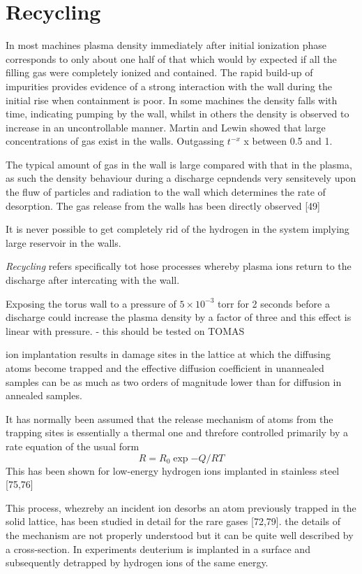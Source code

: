 \chapter{Recycling}

In most machines plasma density immediately after initial ionization phase corresponds to only about one half of that which would by expected if all the filling gas were completely ionized and contained.
The rapid build-up of impurities provides evidence of a strong interaction with the wall during the initial rise when containment is poor.
In some machines the density falls with time, indicating pumping by the wall, whilst in others the density is observed to increase in an uncontrollable manner.
Martin and Lewin showed that large concentrations of gas exist in the walls. Outgassing $t^{-x}$ x between 0.5 and 1.

The typical amount of gas in the wall is large compared with that in the plasma, as such the density behaviour during a discharge cepndends very sensitevely upon the fluw of particles and radiation to the wall
which determines the rate of desorption.
The gas release from the walls has been directly observed [49]

It is never possible to get completely rid of the hydrogen in the system implying large reservoir in the walls.

\textit{Recycling} refers specifically tot hose processes whereby plasma ions return to the discharge after intercating with the wall.

Exposing the torus wall to a pressure of $5 \times 10^{-3}$ torr for 2 seconds before a discharge could increase the plasma density by a factor of three and this effect is linear with pressure. - this should be tested on TOMAS

ion implantation results in damage sites in the lattice at which the diffusing atoms become trapped and the effective diffusion coefficient in unannealed samples can be as much as two orders of magnitude lower than for diffusion in annealed samples.

It has normally been assumed that the release mechanism of atoms from the trapping sites is essentially a thermal one and threfore controlled primarily by a rate equation of the usual form
\begin{equation}
    R = R_0 \exp{-Q/RT}
\end{equation}
This has been shown for low-energy hydrogen ions implanted in stainless steel [75,76]

This process, whezreby an incident ion desorbs an atom previously trapped in the solid lattice, has been studied in detail for the rare gases [72,79].
the details of the mechanism are not properly understood but it can be quite well described by a 
cross-section. In experiments deuterium is implanted in a surface and subsequently detrapped by hydrogen ions of the same energy.

